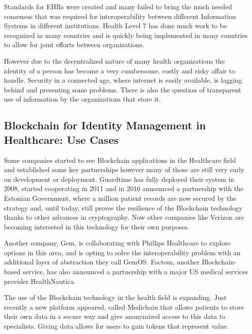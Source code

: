 \documentclass[]{llncs}
\begin{document}
Standards for EHRs were created and many failed to bring the much needed 
consensus that was required for interoperability between different 
Information Systems in different institutions. 
Health Level 7 has done much work to be recognized in many countries and 
is quickly being implemented in many countries to allow for joint efforts 
between organizations.

However due to the decentralized nature of many health organizations the 
identity of a person has become a very cumbersome, costly and risky affair to handle. 
Security in a connected age, where internet is easily available, is lagging behind 
and presenting some problems. 
There is also the question of transparent use of information by the organizations 
that store it.
%

\subsection{Blockchain for Identity Management in Healthcare: Use Cases}
Some companies started to see Blockchain applications in the Healthcare field 
and established some key partnerships however many of those are still very early 
on development or deployment. Guardtime has fully deployed their system in 2008, started 
cooperating in 2011 and in 2016 announced a partnership with the Estonian Government, 
where a million patient records are now secured by the strategy and, until today, 
still proves the resilience of the Blockchain technology thanks to other advances in cryptography. 
Now other companies like Verizon are becoming interested in this technology for their own purposes.
\cite{GuardTime2018,EstonianGovernmentGuardTime2016}

Another company, Gem, is collaborating with Phillips Healthcare to explore options 
in this area, and is opting to solve the interoperability problem with an additional 
layer of abstraction they call GemOS. 
Factom, another Blockchain-based service, has also announced a partnership with a 
major US medical services provider HealthNautica.\cite{BlockchainCompHealth2017,FactomPartnership2017}

The use of the Blockchain technology in the health field is expanding. Just recently a new 
platform appeared, called Medichain that allows patients to store their own data in a secure 
way and give anonymized access to this data to specialists. Giving data allows for users to gain 
tokens that represent value. \cite{MediChain2018} 
\end{document}
